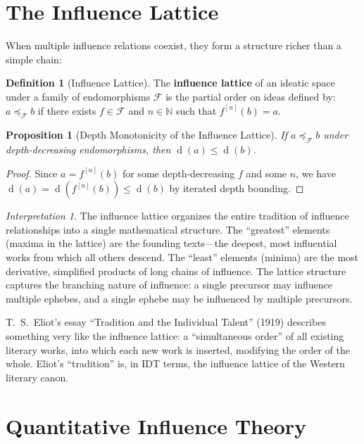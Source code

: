 \documentclass[11pt,openany]{book}
\theoremstyle{definition}
\newtheorem{definition}[axiom]{Definition}
\theoremstyle{plain}
\newtheorem{proposition}[axiom]{Proposition}
\theoremstyle{remark}
\newtheorem{interpretation}[axiom]{Interpretation}
\newcommand{\depth}{\operatorname{d}}       %
\begin{document}
\section{The Influence Lattice}

When multiple influence relations coexist, they form a structure richer than a simple chain:

\begin{definition}[Influence Lattice]
The \textbf{influence lattice} of an ideatic space under a family of endomorphisms $\mathcal{F}$ is the partial order on ideas defined by: $a \preceq_\mathcal{F} b$ if there exists $f \in \mathcal{F}$ and $n \in \mathbb{N}$ such that $f^{[n]}(b) = a$.
\end{definition}

\begin{proposition}[Depth Monotonicity of the Influence Lattice]
If $a \preceq_\mathcal{F} b$ under depth-decreasing endomorphisms, then $\depth(a) \leq \depth(b)$.
\end{proposition}

\begin{proof}
Since $a = f^{[n]}(b)$ for some depth-decreasing $f$ and some $n$, we have $\depth(a) = \depth(f^{[n]}(b)) \leq \depth(b)$ by iterated depth bounding.
\end{proof}

\begin{interpretation}
The influence lattice organizes the entire tradition of influence relationships into a single mathematical structure. The ``greatest'' elements (maxima in the lattice) are the founding texts---the deepest, most influential works from which all others descend. The ``least'' elements (minima) are the most derivative, simplified products of long chains of influence. The lattice structure captures the branching nature of influence: a single precursor may influence multiple ephebes, and a single ephebe may be influenced by multiple precursors.

T.~S.~Eliot's essay ``Tradition and the Individual Talent'' (1919) describes something very like the influence lattice: a ``simultaneous order'' of all existing literary works, into which each new work is inserted, modifying the order of the whole. Eliot's ``tradition'' is, in IDT terms, the influence lattice of the Western literary canon.
\end{interpretation}

\section{Quantitative Influence Theory}
\end{document}
